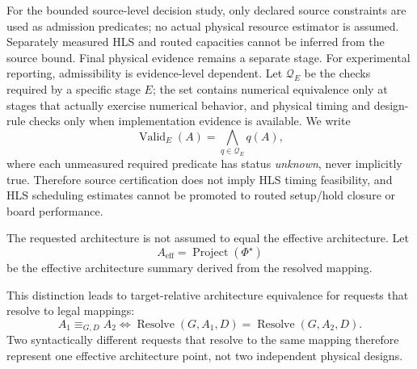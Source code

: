 \documentclass{article}
\begin{document}
For the bounded source-level decision study, only declared source constraints are used as admission predicates; no actual physical resource estimator is assumed. Separately measured HLS and routed capacities cannot be inferred from the source bound. Final physical evidence remains a separate stage. For experimental reporting, admissibility is evidence-level dependent. Let $\mathcal{Q}_E$ be the checks required by a specific stage $E$; the set contains numerical equivalence only at stages that actually exercise numerical behavior, and physical timing and design-rule checks only when implementation evidence is available. We write
\begin{equation}
\operatorname{Valid}_{E}(A)=\bigwedge_{q\in\mathcal{Q}_E}q(A),
\label{eq:validity-predicate}
\end{equation}
where each unmeasured required predicate has status \emph{unknown}, never implicitly true. Therefore source certification does not imply HLS timing feasibility, and HLS scheduling estimates cannot be promoted to routed setup/hold closure or board performance.


The requested architecture is not assumed to equal the effective architecture. Let
\begin{equation}
A_{\mathrm{eff}}
=
\operatorname{Project}(\Phi^\star)
\end{equation}
be the effective architecture summary derived from the resolved mapping.

This distinction leads to target-relative architecture equivalence for requests that resolve to legal mappings:
\begin{equation}
A_1
\equiv_{G,D}
A_2
\iff
\operatorname{Resolve}(G,A_1,D)
=
\operatorname{Resolve}(G,A_2,D).
\label{eq:architecture-equivalence}
\end{equation}
Two syntactically different requests that resolve to the same mapping therefore represent one effective architecture point, not two independent physical designs.
\end{document}
